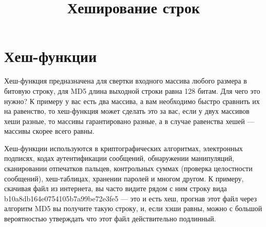 \documentclass[a4paper, 12pt, oneside]{scrartcl}
\title{Хеширование строк}
\author{}
\date{}
\begin{document}
	\maketitle
	\section{Хеш-функции}\label{sec:section1}
	Хеш-функция предназначена для свертки входного массива любого размера в битовую строку, для MD5 длина выходной строки равна 128 битам. Для чего это нужно?
	К примеру у вас есть два массива, а вам необходимо быстро сравнить их на равенство, то хеш-функция может сделать это за вас, если у двух массивов хеши разные, то массивы гарантировано разные, а в случае равенства хешей — массивы скорее всего равны.
	
	Хеш-функции используются в криптографических алгоритмах, электронных подписях, кодах аутентификации сообщений, обнаружении манипуляций, сканировании отпечатков пальцев, контрольных суммах (проверка целостности сообщений), хеш-таблицах, хранении паролей и многом другом. К примеру, скачивая файл из интернета, вы часто видите рядом с ним строку вида b10a8db164e0754105b7a99be72e3fe5 — это и есть хеш, прогнав этот файл через алгоритм MD5 вы получите такую строку, и, если хэши равны, можно с большой вероятностью утверждать что этот файл действительно подлинный.~\cite{managementsystem}

	\par
\end{document}
